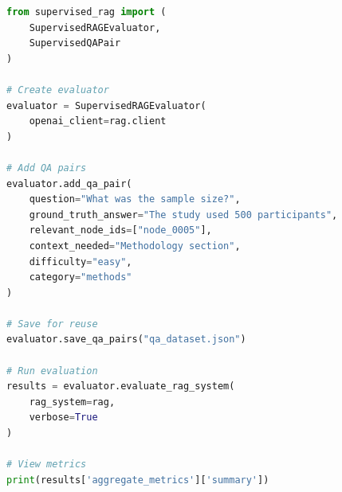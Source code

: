\begin{lstlisting}[language=Python, caption=Evaluation Example]
from supervised_rag import (
    SupervisedRAGEvaluator,
    SupervisedQAPair
)

# Create evaluator
evaluator = SupervisedRAGEvaluator(
    openai_client=rag.client
)

# Add QA pairs
evaluator.add_qa_pair(
    question="What was the sample size?",
    ground_truth_answer="The study used 500 participants",
    relevant_node_ids=["node_0005"],
    context_needed="Methodology section",
    difficulty="easy",
    category="methods"
)

# Save for reuse
evaluator.save_qa_pairs("qa_dataset.json")

# Run evaluation
results = evaluator.evaluate_rag_system(
    rag_system=rag,
    verbose=True
)

# View metrics
print(results['aggregate_metrics']['summary'])
\end{lstlisting}



